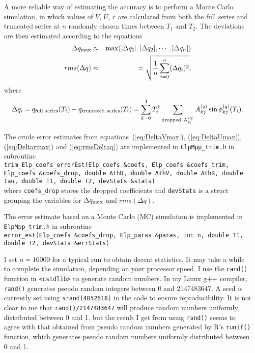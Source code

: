 \documentclass[12pt]{article}
\newcommand \beq {\begin{equation}}
\newcommand \eeq {\end{equation}}
\newcommand \beqn {\begin{eqnarray}}
\newcommand \eeqn {\end{eqnarray}}
\begin{document}
A more reliable way of estimating the accuracy is to perform a Monte Carlo simulation, 
in which values of $V$, $U$, $r$ are calculated from both the full series and truncated 
series at $n$ randomly chosen times between $T_1$ and $T_2$. The deviations 
are then estimated according to the equations 
\beqn
  \Delta q_{\rm max} &\approx& {\rm max}(|\Delta q_1|, |\Delta q_2|, \cdots, |\Delta q_n|) 
\label{eq:DeltaqmaxMC} \\
  rms(\Delta q) &\approx & = \sqrt{ \frac{1}{n}\sum_{i=0}^n (\Delta q_i)^2 } ,
\label{DeltaqrmsMC}
\eeqn
where 
\beq
  \Delta q_i = q_{\rm full~series}(T_i) - q_{\rm truncated~series}(T_i) 
= \sum_{k=0}^3 T_i^k \sum_{\rm dropped~{A_{kj}^{(q)}}} A_{kj}^{(q)} 
\sin \phi_{kj}^{(q)}(T_i) .
\eeq

The crude error estimates from equations~(\ref{eq:DeltaVmax}),
(\ref{eq:DeltaUmax}), (\ref{eq:Deltarmax}) and (\ref{eq:rmsDeltaq}) are implemented 
in {\tt ElpMpp\_trim.h} in subroutine \\
{\tt trim\_Elp\_coefs\_errorEst(Elp\_coefs \&coefs, Elp\_coefs \&coefs\_trim, Elp\_coefs \&coefs\_drop,
                    double AthU, double AthV, double AthR, double tau,
                    double T1, double T2, devStats \&stats)} \\
where {\tt coefs\_drop} stores the dropped coefficients and 
{\tt devStats} is a struct grouping the variables for $\Delta q_{\rm max}$ 
and $rms(\Delta q)$. 

The error estimate based on a Monte Carlo (MC) simulation is implemented in 
{\tt ElpMpp\_trim.h} in subroutine \\
{\tt error\_est(Elp\_coefs \&coefs\_drop, Elp\_paras \&paras,
               int n, double T1, double T2, devStats \&errStats)} 

I set $n=10000$ for a typical run to obtain decent statistics. It may 
take a while to complete the simulation, depending on your processor speed. 
I use the {\tt rand()} function in {\tt <cstdlib>} to generate random numbers.
In my Linux g++ compiler, {\tt rand()} generates pseudo random integers between 
0 and 2147483647.
A seed is currently set using {\tt srand(4852618)} in the code to ensure reproducibility. 
It is not clear to me that {\tt rand()/2147483647} will produce random 
numbers uniformly distributed between 0 and 1, but the result I get from 
using {\tt rand()} seems to agree with that 
obtained from pseudo random numbers generated by R's {\tt runif()} function, which 
generates pseudo random numbers uniformly distributed between 0 and 1.
\end{document}

